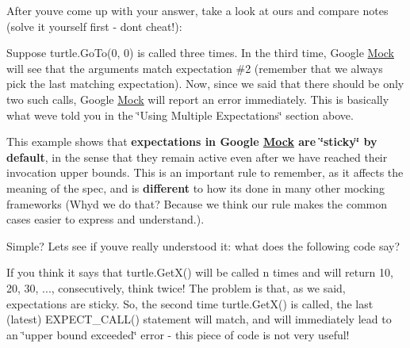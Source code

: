 After you\textquotesingle{}ve come up with your answer, take a look at ours and compare notes (solve it yourself first -\/ don\textquotesingle{}t cheat!)\+:


\begin{DoxyCode}{0}
\end{DoxyCode}


Suppose {\ttfamily turtle.\+Go\+To(0, 0)} is called three times. In the third time, Google \mbox{\hyperlink{class_mock}{Mock}} will see that the arguments match expectation \#2 (remember that we always pick the last matching expectation). Now, since we said that there should be only two such calls, Google \mbox{\hyperlink{class_mock}{Mock}} will report an error immediately. This is basically what we\textquotesingle{}ve told you in the \char`\"{}\+Using Multiple Expectations\char`\"{} section above.

This example shows that {\bfseries{expectations in Google \mbox{\hyperlink{class_mock}{Mock}} are \char`\"{}sticky\char`\"{} by default}}, in the sense that they remain active even after we have reached their invocation upper bounds. This is an important rule to remember, as it affects the meaning of the spec, and is {\bfseries{different}} to how it\textquotesingle{}s done in many other mocking frameworks (Why\textquotesingle{}d we do that? Because we think our rule makes the common cases easier to express and understand.).

Simple? Let\textquotesingle{}s see if you\textquotesingle{}ve really understood it\+: what does the following code say?


\begin{DoxyCode}{0}
\DoxyCodeLine{\}}
\end{DoxyCode}


If you think it says that {\ttfamily turtle.\+Get\+X()} will be called {\ttfamily n} times and will return 10, 20, 30, ..., consecutively, think twice! The problem is that, as we said, expectations are sticky. So, the second time {\ttfamily turtle.\+Get\+X()} is called, the last (latest) {\ttfamily E\+X\+P\+E\+C\+T\+\_\+\+C\+A\+L\+L()} statement will match, and will immediately lead to an \char`\"{}upper bound exceeded\char`\"{} error -\/ this piece of code is not very useful!

